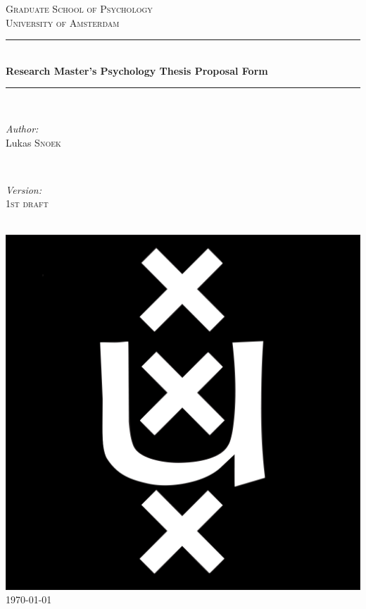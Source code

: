 \documentclass[12pt,a4paper]{article}
\begin{document}
\begin{titlepage}

\newcommand{\HRule}{\rule{\linewidth}{0.5mm}} 
\center 

\textsc{\LARGE Graduate School of Psychology}\\[1cm] 
\textsc{\Large University of Amsterdam}\\[1cm] %

\HRule \\[0.4cm]
{ \huge \bfseries Research Master's Psychology Thesis Proposal Form}\\[0.4cm] 
\HRule \\[1.5cm]
 
\begin{minipage}{0.4\textwidth}
\begin{flushleft} \large
\emph{Author:}\\
Lukas \textsc{Snoek} 
\end{flushleft}
\end{minipage}
~
\begin{minipage}{0.4\textwidth}
\begin{flushright} \large
\emph{Version:} \\
\textsc{1st draft} 
\end{flushright}
\end{minipage}\\[2cm]

\includegraphics[scale=0.15]{uva_logo3}\\[2cm] 

{\large \today}\\[3cm]

\vfill 

\end{titlepage}
\end{document}

